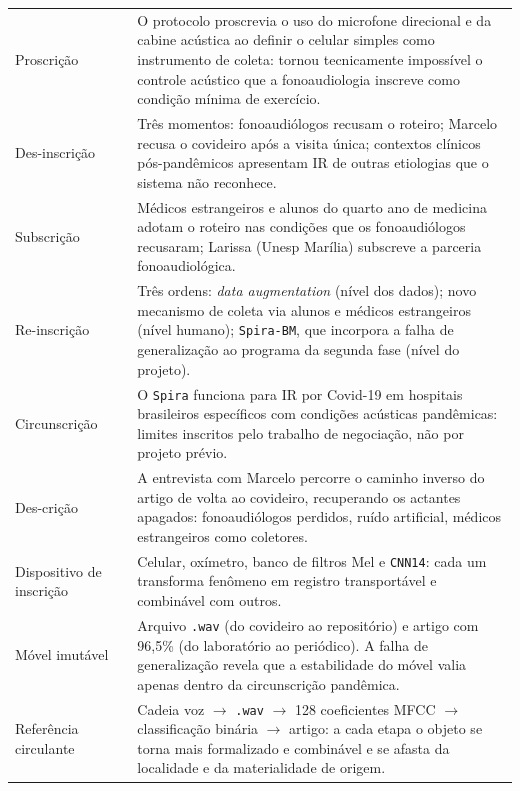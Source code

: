 \begin{longtable}{p{2.8cm}p{3.2cm}p{7.5cm}}
\addlinespace
Proscrição & \parencite{Akrich1992Description}& O protocolo proscrevia o uso do microfone direcional e da cabine acústica ao definir o celular simples como instrumento de coleta: tornou tecnicamente impossível o controle acústico que a fonoaudiologia inscreve como condição mínima de exercício. \\
\addlinespace
Des-inscrição & \parencite{Akrich1992Description}& Três momentos: fonoaudiólogos recusam o roteiro; Marcelo recusa o covideiro após a visita única; contextos clínicos pós-pandêmicos apresentam IR de outras etiologias que o sistema não reconhece. \\
\addlinespace
Subscrição & \parencite{AkrichLatour1992Convenient} & Médicos estrangeiros e alunos do quarto ano de medicina adotam o roteiro nas condições que os fonoaudiólogos recusaram; Larissa (Unesp Marília) subscreve a parceria fonoaudiológica. \\
\addlinespace
Re-inscrição & \parencite{Latour1992Missing,AkrichLatour1992Convenient} & Três ordens: \textit{data augmentation} (nível dos dados); novo mecanismo de coleta via alunos e médicos estrangeiros (nível humano); \texttt{Spira-BM}, que incorpora a falha de generalização ao programa da segunda fase (nível do projeto). \\
\addlinespace
Circunscrição & \parencite{Akrich1992Description}& O \texttt{Spira} funciona para IR por Covid-19 em hospitais brasileiros específicos com condições acústicas pandêmicas: limites inscritos pelo trabalho de negociação, não por projeto prévio. \\
\addlinespace
Des-crição & \parencite{Akrich1992Description}& A entrevista com Marcelo percorre o caminho inverso do artigo de volta ao covideiro, recuperando os actantes apagados: fonoaudiólogos perdidos, ruído artificial, médicos estrangeiros como coletores. \\
\addlinespace
Dispositivo de inscrição & \parencite{Latour1986Visualization} & Celular, oxímetro, banco de filtros Mel e \texttt{CNN14}: cada um transforma fenômeno em registro transportável e combinável com outros. \\
\addlinespace
Móvel imutável & \parencite{Latour1986Visualization} & Arquivo \texttt{.wav} (do covideiro ao repositório) e artigo com 96,5\% (do laboratório ao periódico). A falha de generalização revela que a estabilidade do móvel valia apenas dentro da circunscrição pandêmica. \\
\addlinespace
Referência circulante & \parencite{Latour2017Esperanca} & Cadeia voz $\to$ \texttt{.wav} $\to$ 128 coeficientes MFCC $\to$ classificação binária $\to$ artigo: a cada etapa o objeto se torna mais formalizado e combinável e se afasta da localidade e da materialidade de origem. \\

\end{longtable}
